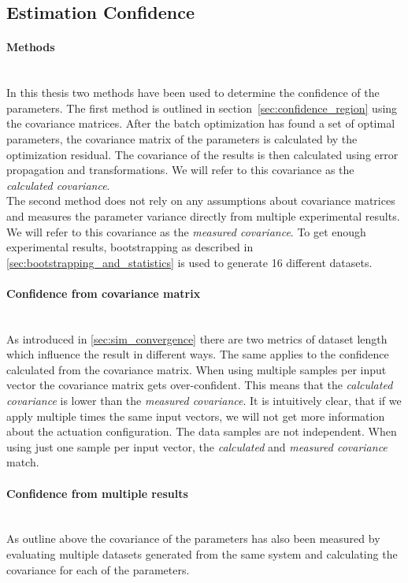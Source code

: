 \subsection{Estimation Confidence}
\paragraph{Methods} ~\\
In this thesis two methods have been used to determine  the confidence of the parameters.
The first method is outlined in section~\ref{sec:confidence_region} using the covariance matrices.
After the batch optimization has found a set of optimal parameters, the covariance matrix of the parameters is calculated by the optimization residual.
The covariance of the results is then calculated using error propagation and transformations.
We will refer to this covariance as the \textit{calculated covariance}.\\
The second method does not rely on any assumptions about covariance matrices and measures the parameter variance directly from multiple experimental results.
We will refer to this covariance as the \textit{measured covariance}.
To get enough experimental results, bootstrapping as described in \cref{sec:bootstrapping_and_statistics} is used to generate 16 different datasets.

\paragraph{Confidence from covariance matrix} ~\\
As introduced in \cref{sec:sim_convergence} there are two metrics of dataset length which influence the result in different ways.
The same applies to the confidence calculated from the covariance matrix.
When using multiple samples per input vector the covariance matrix gets over-confident.
This means that the \textit{calculated covariance} is lower than the \textit{measured covariance}.
It is intuitively clear, that if we apply multiple times the same input vectors, we will not get more information about the actuation configuration.
The data samples are not independent.
When using just one sample per input vector, the \textit{calculated} and \textit{measured covariance} match.

\paragraph{Confidence from multiple results} ~\\
As outline above the covariance of the parameters has also been measured by evaluating multiple datasets generated from the same system and calculating the covariance for each of the parameters.\\

